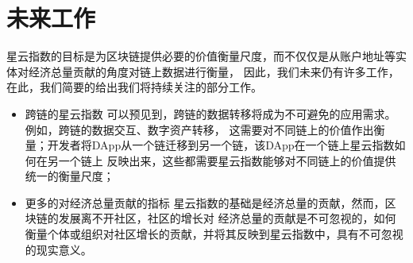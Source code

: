 \section{未来工作}
星云指数的目标是为区块链提供必要的价值衡量尺度，而不仅仅是从账户地址等实体对经济总量贡献的角度对链上数据进行衡量，
因此，我们未来仍有许多工作，在此，我们简要的给出我们将持续关注的部分工作。
\begin{itemize}
\item{跨链的星云指数} 可以预见到，跨链的数据转移将成为不可避免的应用需求。例如，跨链的数据交互、数字资产转移，
这需要对不同链上的价值作出衡量；开发者将DApp从一个链迁移到另一个链，该DApp在一个链上星云指数如何在另一个链上
反映出来，这些都需要星云指数能够对不同链上的价值提供统一的衡量尺度；
\item{更多的对经济总量贡献的指标} 星云指数的基础是经济总量的贡献，然而，区块链的发展离不开社区，社区的增长对
经济总量的贡献是不可忽视的，如何衡量个体或组织对社区增长的贡献，并将其反映到星云指数中，具有不可忽视的现实意义。

\end{itemize}
